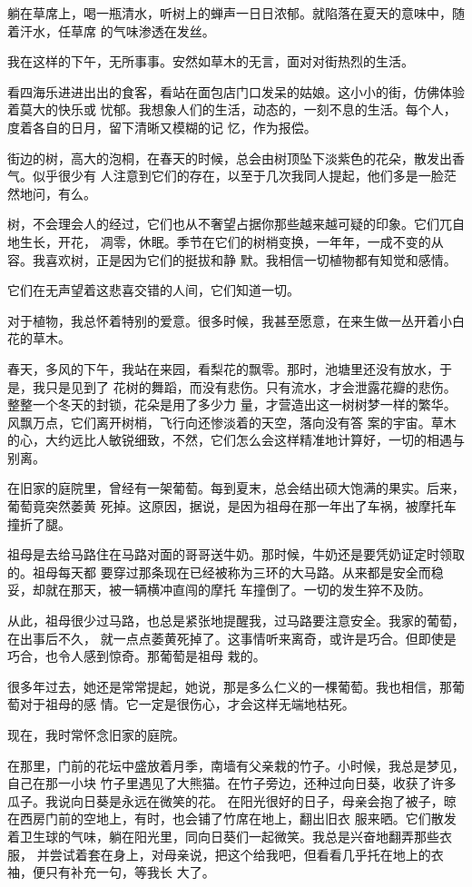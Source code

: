 		躺在草席上，喝一瓶清水，听树上的蝉声一日日浓郁。就陷落在夏天的意味中，随着汗水，任草席
	的气味渗透在发丝。


		我在这样的下午，无所事事。安然如草木的无言，面对对街热烈的生活。

		看四海乐进进出出的食客，看站在面包店门口发呆的姑娘。这小小的街，仿佛体验着莫大的快乐或
	忧郁。我想象人们的生活，动态的，一刻不息的生活。每个人，度着各自的日月，留下清晰又模糊的记
	忆，作为报偿。

		街边的树，高大的泡桐，在春天的时候，总会由树顶坠下淡紫色的花朵，散发出香气。似乎很少有
	人注意到它们的存在，以至于几次我同人提起，他们多是一脸茫然地问，有么。


		树，不会理会人的经过，它们也从不奢望占据你那些越来越可疑的印象。它们兀自地生长，开花，
	凋零，休眠。季节在它们的树梢变换，一年年，一成不变的从容。我喜欢树，正是因为它们的挺拔和静
	默。我相信一切植物都有知觉和感情。

		它们在无声望着这悲喜交错的人间，它们知道一切。


		对于植物，我总怀着特别的爱意。很多时候，我甚至愿意，在来生做一丛开着小白花的草木。


		春天，多风的下午，我站在来园，看梨花的飘零。那时，池塘里还没有放水，于是，我只是见到了
	花树的舞蹈，而没有悲伤。只有流水，才会泄露花瓣的悲伤。整整一个冬天的封锁，花朵是用了多少力
	量，才营造出这一树树梦一样的繁华。风飘万点，它们离开树梢，飞行向还惨淡着的天空，落向没有答
	案的宇宙。草木的心，大约远比人敏锐细致，不然，它们怎么会这样精准地计算好，一切的相遇与别离。


		在旧家的庭院里，曾经有一架葡萄。每到夏末，总会结出硕大饱满的果实。后来，葡萄竟突然萎黄
	死掉。这原因，据说，是因为祖母在那一年出了车祸，被摩托车撞折了腿。


		祖母是去给马路住在马路对面的哥哥送牛奶。那时候，牛奶还是要凭奶证定时领取的。祖母每天都
	要穿过那条现在已经被称为三环的大马路。从来都是安全而稳妥，却就在那天，被一辆横冲直闯的摩托
	车撞倒了。一切的发生猝不及防。

		从此，祖母很少过马路，也总是紧张地提醒我，过马路要注意安全。我家的葡萄，在出事后不久，
	就一点点萎黄死掉了。这事情听来离奇，或许是巧合。但即使是巧合，也令人感到惊奇。那葡萄是祖母
	栽的。

		很多年过去，她还是常常提起，她说，那是多么仁义的一棵葡萄。我也相信，那葡萄对于祖母的感
	情。它一定是很伤心，才会这样无端地枯死。


		现在，我时常怀念旧家的庭院。

		在那里，门前的花坛中盛放着月季，南墙有父亲栽的竹子。小时候，我总是梦见，自己在那一小块
	竹子里遇见了大熊猫。在竹子旁边，还种过向日葵，收获了许多瓜子。我说向日葵是永远在微笑的花。
	在阳光很好的日子，母亲会抱了被子，晾在西房门前的空地上，有时，也会铺了竹席在地上，翻出旧衣
	服来晒。它们散发着卫生球的气味，躺在阳光里，同向日葵们一起微笑。我总是兴奋地翻弄那些衣服，
	并尝试着套在身上，对母亲说，把这个给我吧，但看看几乎托在地上的衣袖，便只有补充一句，等我长
	大了。


